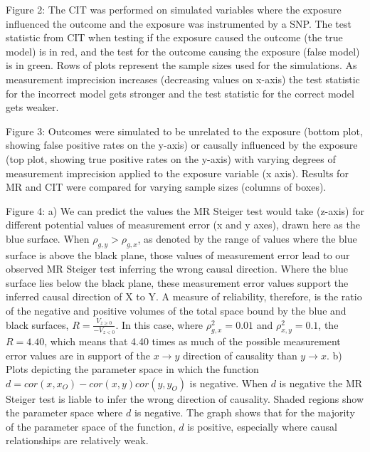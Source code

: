 \documentclass[]{article}
\begin{document}
Figure 2: The CIT was performed on simulated variables where the
exposure influenced the outcome and the exposure was instrumented by a
SNP. The test statistic from CIT when testing if the exposure caused the
outcome (the true model) is in red, and the test for the outcome causing
the exposure (false model) is in green. Rows of plots represent the
sample sizes used for the simulations. As measurement imprecision
increases (decreasing values on x-axis) the test statistic for the
incorrect model gets stronger and the test statistic for the correct
model gets weaker.

Figure 3: Outcomes were simulated to be unrelated to the exposure
(bottom plot, showing false positive rates on the y-axis) or causally
influenced by the exposure (top plot, showing true positive rates on the
y-axis) with varying degrees of measurement imprecision applied to the
exposure variable (x axis). Results for MR and CIT were compared for
varying sample sizes (columns of boxes).

Figure 4: a) We can predict the values the MR Steiger test would take
(z-axis) for different potential values of measurement error (x and y
axes), drawn here as the blue surface. When \(\rho_{g,y} > \rho_{g,x}\),
as denoted by the range of values where the blue surface is above the
black plane, those values of measurement error lead to our observed MR
Steiger test inferring the wrong causal direction. Where the blue
surface lies below the black plane, these measurement error values
support the inferred causal direction of X to Y. A measure of
reliability, therefore, is the ratio of the negative and positive
volumes of the total space bound by the blue and black surfaces,
\(R = \frac{V_{z \geq 0}}{ - V_{z < 0} }\). In this case, where
\(\rho_{g,x}^2 = 0.01\) and \(\rho_{x,y}^2 = 0.1\), the \(R = 4.40\),
which means that 4.40 times as much of the possible measurement error
values are in support of the \(x \rightarrow y\) direction of causality
than \(y \rightarrow x\). b) Plots depicting the parameter space in
which the function \(d = cor(x, x_O) - cor(x,y)cor(y, y_O)\) is
negative. When \(d\) is negative the MR Steiger test is liable to infer
the wrong direction of causality. Shaded regions show the parameter
space where \(d\) is negative. The graph shows that for the majority of
the parameter space of the function, \(d\) is positive, especially where
causal relationships are relatively weak.
\end{document}
